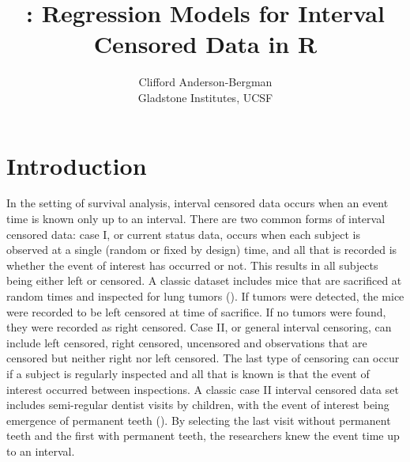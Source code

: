 \documentclass[article]{jss}
\author{Clifford Anderson-Bergman\\Gladstone Institutes, UCSF}
\title{\pkg{icenReg}: Regression Models for Interval Censored Data in R}
\begin{document}

\section[intro]{Introduction}

	In the setting of survival analysis, interval censored data occurs when an event time is known only up to an interval. There are two common forms of interval censored data: case I, or current status data, occurs when each subject is observed at a single (random or fixed by design) time, and all that is recorded is whether the event of interest has occurred or not. This results in all subjects being either left or censored. A classic dataset includes mice that are sacrificed at random times and inspected for lung tumors (\cite{mice_tumors}). If tumors were detected, the mice were recorded to be left censored at time of sacrifice. If no tumors were found, they were recorded as right censored. Case II, or general interval censoring, can include left censored, right censored, uncensored and observations that are censored but neither right nor left censored. The last type of censoring can occur if a subject is regularly inspected and all that is known is that the event of interest occurred between inspections. A classic case II interval censored data set includes semi-regular dentist visits by children, with the event of interest being emergence of permanent teeth (\cite{toothStudy}). By selecting the last visit without permanent teeth and the first with permanent teeth, the researchers knew the event time up to an interval. 
	
\end{document}
